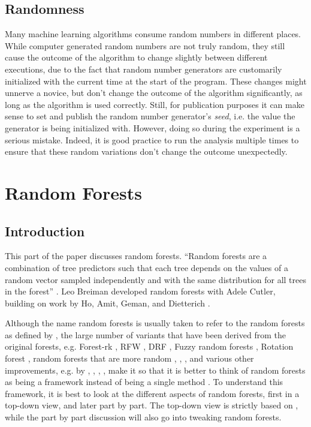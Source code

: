 \documentclass[a4paper,man,12pt,apacite,floatsintext,draftfirst]{apa6} %
\begin{document}
\subsection{Randomness}
Many machine learning algorithms consume random numbers in different places.
While computer generated random numbers are not truly random, they still
cause the outcome of the algorithm to change slightly between different
executions, due to the fact that random number generators are customarily
initialized with the current time at the start of the program.
These changes might unnerve a novice, but don't change the outcome of the
algorithm significantly, as long as the algorithm is used correctly.
Still, for publication purposes it can make sense to set and publish the
random number generator's \emph{seed}, i.e. the value the generator is being
initialized with.
However, doing so during the experiment
is a serious mistake.
Indeed, it is good practice to run the analysis multiple times to ensure
that these random variations don't change the outcome unexpectedly.

\newpage
\section{Random Forests}

\subsection{Introduction}
This part of the paper discusses random forests.
“Random forests are a combination of tree predictors such that each tree
depends on the values of a random vector sampled independently and with
the same distribution for all trees in the forest” \cite{breiman2001random}.
Leo Breiman developed random forests with Adele Cutler, building on work
by Ho, Amit, Geman, and Dietterich \cite{wpRF}.

Although the name random forests is usually taken to refer to the random
forests as defined by \cite{breiman2001random}, the large number of
variants that have been derived from the original forests, e.g.
Forest-rk \cite{bernard2008forest}, RFW \cite{maudes2012random},
DRF \cite{bernard2012dynamic}, Fuzzy random forests \cite{bonissone2008fuzzy},
Rotation forest \cite{rodriguez2006rotation}, random forests that are
more random \cite{geurts2006extremely}, \cite{liu2005maximizing},
\cite{cutler2001pert}, and various other improvements, e.g. by
\cite{banfield2007comparison}, \cite{robnik2004improving},
\cite{strobl2009introduction}, \cite{zhang2012bias}, make it so that it
is better to think of random forests as being a framework instead of being
a single method \cite{wpRF}.
To understand this framework, it is best to look at the different aspects
of random forests, first in a top-down view, and later part by part.
The top-down view is strictly based on \cite{breiman2001random},
while the part by part discussion will also go into tweaking random forests.
\end{document}

